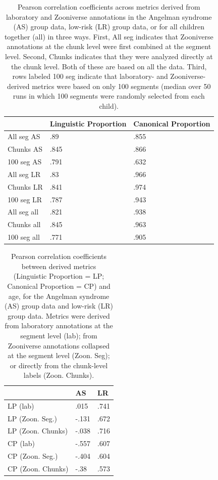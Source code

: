 \documentclass[english,,man]{apa6}
\begin{document}
\begin{table}

\caption{\label{tab:tab-cors}Pearson correlation coefficients across metrics derived from laboratory and Zooniverse annotations in the Angelman syndrome (AS) group data, low-risk (LR) group data, or for all children together (all) in three ways. First, All seg indicates that Zooniverse annotations at the chunk level were first combined at the segment level. Second, Chunks indicates that they were analyzed directly at the chunk level. Both of these are based on all the data. Third, rows labeled 100 seg indicate that laboratory- and Zooniverse-derived metrics were based on only 100 segments (median over 50 runs in which 100 segments were randomly selected from each child).}
\centering
\begin{tabular}[t]{l|l|l}
\hline
  & Linguistic Proportion & Canonical Proportion\\
\hline
All seg AS & .89 & .855\\
\hline
Chunks AS & .845 & .866\\
\hline
100 seg AS & .791 & .632\\
\hline
All seg LR & .83 & .966\\
\hline
Chunks LR & .841 & .974\\
\hline
100 seg LR & .787 & .943\\
\hline
All seg all & .821 & .938\\
\hline
Chunks all & .845 & .963\\
\hline
100 seg all & .771 & .905\\
\hline
\end{tabular}
\end{table}

\begin{table}

\caption{\label{tab:tab-corage}Pearson correlation coefficients between derived metrics (Linguistic Proportion = LP; Canonical Proportion = CP) and age, for the Angelman syndrome (AS) group data and low-risk (LR) group data. Metrics were derived from laboratory annotations at the segment level (lab); from Zooniverse annotations collapsed at the segment level (Zoon. Seg); or directly from the chunk-level labels (Zoon. Chunks). }
\centering
\begin{tabular}[t]{l|l|l}
\hline
  & AS & LR\\
\hline
LP (lab) & .015 & .741\\
\hline
LP (Zoon. Seg.) & -.131 & .672\\
\hline
LP (Zoon. Chunks) & -.038 & .716\\
\hline
CP (lab) & -.557 & .607\\
\hline
CP (Zoon. Seg.) & -.404 & .604\\
\hline
CP (Zoon. Chunks) & -.38 & .573\\
\hline
\end{tabular}
\end{table}
\end{document}
